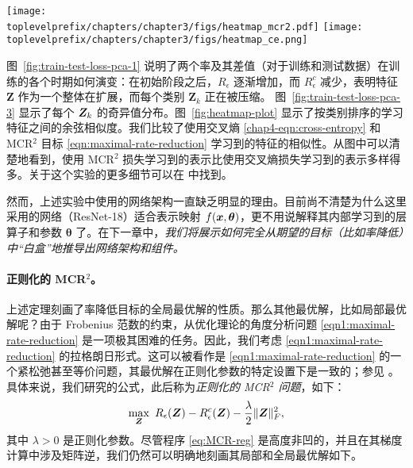 \documentclass[../../book-main.tex]{subfiles}
\begin{document}
\begin{example}
	\begin{figure*}[b]
		\begin{center}

			\texttt{[image: \\toplevelprefix/chapters/chapter3/figs/heatmap\_mcr2.pdf]}
			\hspace{0.25cm}
			\texttt{[image: \\toplevelprefix/chapters/chapter3/figs/heatmap\_ce.png]}
			\caption{\small 使用 MCR$^2$ 目标（\textbf{左}）和 CE 损失（\textbf{右}）学习到的特征之间的余弦相似度。}
			\label{fig:heatmap-plot}
		\end{center}
		\vskip -0.1in
	\end{figure*}

	图~\ref{fig:train-test-loss-pca-1} 说明了两个率及其差值（对于训练和测试数据）在训练的各个时期如何演变：在初始阶段之后，$R_\epsilon$ 逐渐增加，而 $R^c_\epsilon$ 减少，表明特征 $\bm Z$ 作为一个整体在扩展，而每个类别 $\bm Z_k$ 正在被压缩。
	图~\ref{fig:train-test-loss-pca-3} 显示了每个 $\bm{Z}_k$ 的奇异值分布。图~\ref{fig:heatmap-plot} 显示了按类别排序的学习特征之间的余弦相似度。我们比较了使用交叉熵 \eqref{chap4-eqn:cross-entropy} 和 MCR$^2$ 目标 \eqref{eqn:maximal-rate-reduction} 学习到的特征的相似性。从图中可以清楚地看到，使用 MCR$^2$ 损失学习到的表示比使用交叉熵损失学习到的表示多样得多。关于这个实验的更多细节可以在 \cite{chan2021redunet} 中找到。
	\label{eg:Rate-Reduction-CIFAR10}
\end{example}


然而，上述实验中使用的网络架构一直缺乏明显的理由。目前尚不清楚为什么这里采用的网络（ResNet-18）适合表示映射 $f(\bm{x}, \bm \theta)$，更不用说解释其内部学习到的层算子和参数 $\bm \theta$ 了。在下一章中，{\em 我们将展示如何完全从期望的目标（比如率降低）中“白盒”地推导出网络架构和组件。}



\paragraph{正则化的 MCR$^2$。}
上述定理刻画了率降低目标的全局最优解的性质。那么其他最优解，比如局部最优解呢？由于 Frobenius 范数的约束，从优化理论的角度分析问题 \eqref{eqn1:maximal-rate-reduction} 是一项极其困难的任务。因此，我们考虑 \eqref{eqn1:maximal-rate-reduction} 的拉格朗日形式。这可以被看作是 \eqref{eqn1:maximal-rate-reduction} 的一个紧松弛甚至等价问题，其最优解在正则化参数的特定设置下是一致的；参见 \cite[Proposition 1]{wang2024global}。
具体来说，我们研究的公式，此后称为\textit{正则化的 MCR$^2$ 问题}，如下：
\begin{align}\label{eq:MCR-reg}
	\max_{\bm Z}\ R_{\epsilon}(\bm{Z}) - R_{\epsilon}^c(\bm{Z}) - \frac{\lambda}{2}\|\bm Z\|_F^2,
\end{align}
其中 $\lambda > 0$ 是正则化参数。尽管程序 \eqref{eq:MCR-reg} 是高度非凹的，并且在其梯度计算中涉及矩阵逆，我们仍然可以明确地刻画其局部和全局最优解如下。
\end{document}
